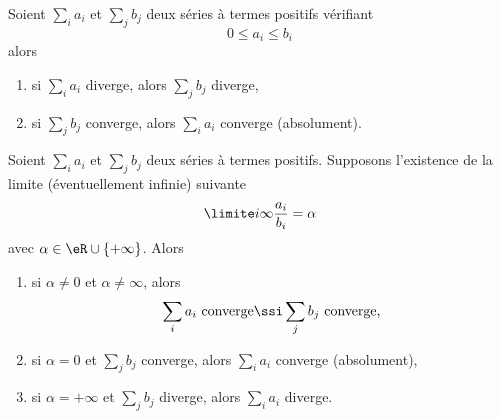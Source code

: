 \begin{lemma}   \label{LemgHWyfG}
Soient $\sum_i a_i$ et $\sum_j
b_j$ deux séries à termes positifs vérifiant
\begin{equation*}
  0 \leq a_i \leq b_i
\end{equation*}
alors
\begin{enumerate}
\item si $\sum_i a_i$ diverge, alors $\sum_j b_j$ diverge,
\item si $\sum_j b_j$ converge, alors $\sum_i a_i$ converge
  (absolument).
  \end{enumerate}
\end{lemma}


\begin{proposition}
 Soient $\sum_i a_i$ et $\sum_j b_j$ deux séries à termes positifs. Supposons l'existence de la limite (éventuellement infinie) suivante
\begin{equation}
  \limite i \infty \frac{a_i}{b_i} = \alpha 
\end{equation}
avec \( \alpha\in \eR\cup\{ +\infty \}\). Alors
\begin{enumerate}
\item si $\alpha \neq 0$ et $\alpha\neq \infty$, alors
  \begin{equation}
    \sum_i a_i \text{~converge} \ssi \sum_j b_j\text{~converge,}
  \end{equation}
\item si $\alpha = 0$ et $\sum_j b_j$ converge, alors $\sum_i a_i$
  converge (absolument),
\item si $\alpha = +\infty$ et $\sum_j b_j$ diverge, alors $\sum_i
  a_i$ diverge.
\end{enumerate}
\end{proposition}


